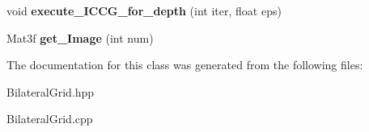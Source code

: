 \begin{DoxyCompactItemize}
\item 
void {\bfseries execute\+\_\+\+I\+C\+C\+G\+\_\+for\+\_\+depth} (int iter, float eps)\hypertarget{classBilateralGrid_a3fe3e289809b9b6709928003e8d58c5e}{}\label{classBilateralGrid_a3fe3e289809b9b6709928003e8d58c5e}

\item 
Mat3f {\bfseries get\+\_\+\+Image} (int num)\hypertarget{classBilateralGrid_a2e69ac4ee7c55b75f5128e78fa8bc319}{}\label{classBilateralGrid_a2e69ac4ee7c55b75f5128e78fa8bc319}

\end{DoxyCompactItemize}


The documentation for this class was generated from the following files\+:\begin{DoxyCompactItemize}
\item 
Bilateral\+Grid.\+hpp\item 
Bilateral\+Grid.\+cpp\end{DoxyCompactItemize}
